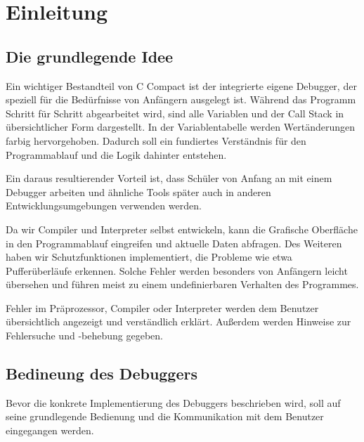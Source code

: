 

\section{Einleitung}


\subsection{Die grundlegende Idee}
Ein wichtiger Bestandteil von C Compact ist der integrierte eigene Debugger, der speziell für die Bedürfnisse von Anfängern ausgelegt ist. Während das Programm Schritt für Schritt abgearbeitet wird, sind alle Variablen und der Call Stack in übersichtlicher Form dargestellt. In der Variablentabelle werden Wertänderungen farbig hervorgehoben. Dadurch soll ein fundiertes Verständnis für den Programmablauf und die Logik dahinter entstehen.

Ein daraus resultierender Vorteil ist, dass Schüler von Anfang an mit einem Debugger arbeiten und ähnliche Tools später auch in anderen Entwicklungsumgebungen verwenden werden.

Da wir Compiler und Interpreter selbst entwickeln, kann die Grafische Oberfläche in den Programmablauf eingreifen und aktuelle Daten abfragen. Des Weiteren haben wir Schutzfunktionen implementiert, die Probleme wie etwa Pufferüberläufe erkennen. Solche Fehler werden besonders von Anfängern leicht übersehen und führen meist zu einem undefinierbaren Verhalten des Programmes.

Fehler im Präprozessor, Compiler oder Interpreter werden dem Benutzer übersichtlich angezeigt und verständlich erklärt. Außerdem werden Hinweise zur Fehlersuche und -behebung gegeben.


\subsection{Bedineung des Debuggers}
Bevor die konkrete Implementierung des Debuggers beschrieben wird, soll auf seine grundlegende Bedienung und die Kommunikation mit dem Benutzer eingegangen werden.

